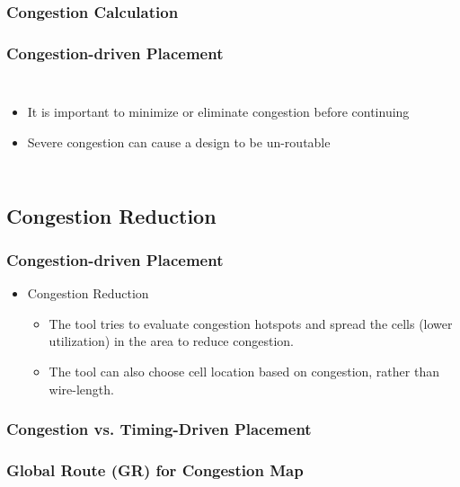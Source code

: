 \documentclass[compress]{beamer}
\begin{document}
\begin{frame}
	\frametitle{Congestion Calculation}
	\begin{center}
	\end{center}
\end{frame}

\begin{frame}
	\frametitle{Congestion-driven Placement}
		\begin{columns}
		\begin{itemize}
			\item It is important to minimize or eliminate congestion before continuing
			
			\item Severe congestion can cause a design to be un-routable
			
		\end{itemize}
		\begin{center}
		\end{center}
	\end{columns}
\end{frame}

\subsection[Solution]{Congestion Reduction}
\begin{frame}
	\frametitle{Congestion-driven Placement}

		\begin{itemize}
			\item Congestion Reduction
			\begin{itemize}
				\item The tool tries to evaluate congestion hotspots
				and spread the cells (lower utilization) in the
				area to reduce congestion.
				\item The tool can also choose cell location based
				on congestion, rather than wire-length.
			\end{itemize}
			
		\end{itemize}
	
		\begin{center}
		\end{center}

\end{frame}

\begin{frame}
	\frametitle{Congestion vs. Timing-Driven Placement}
	\begin{center}
	\end{center}
\end{frame}
\begin{frame}
	\frametitle{Global Route (GR) for Congestion Map}
	\begin{center}
	\end{center}
\end{frame}
\end{document}
